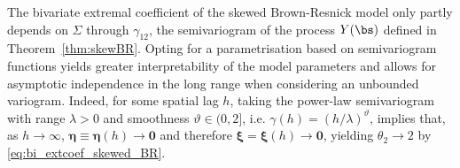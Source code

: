 \documentclass[12pt]{article}
\begin{document}
The bivariate extremal coefficient of the skewed Brown-Resnick model only partly depends on $\Sigma$ through $\gamma_{12}$, the semivariogram of the process $Y(\bs)$ defined in Theorem~\ref{thm:skewBR}. 
%
Opting for a parametrisation based on semivariogram functions 
yields
greater interpretability of the model parameters and allows for asymptotic independence in the long range when considering an unbounded variogram. Indeed, for some spatial lag $h$, taking the power-law semivariogram with range $\lambda>0$ and  smoothness $\vartheta \in (0,2]$, i.e. $\gamma(h) = (h/\lambda)^\vartheta$,
implies that, as $h \rightarrow \infty$, $\bm \eta \equiv \bm \eta (h) \rightarrow \bm 0$ and therefore $\bm \xi = \bm \xi(h) \rightarrow \bm 0$, yielding $\theta_2 \rightarrow 2$ by \eqref{eq:bi_extcoef_skewed_BR}.
%
\end{document}
